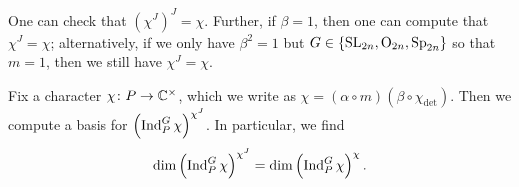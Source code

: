 \begin{remark}
    One can check that $\left(\chi^J\right)^J=\chi$. Further, if $\beta=1$, then one can compute that $\chi^J=\chi$; alternatively, if we only have $\beta^2=1$ but $G\in\{\mathrm{SL}_{2n},\mathrm{O}_{2n},\mathrm{Sp}_{2n}\}$ so that $m=1$, then we still have $\chi^J=\chi$.
	
\end{remark}
\begin{proposition} \label{prop:twisted-ind-basis}
	Fix a character $\chi\colon P\to\mathbb C^\times$, which we write as $\chi=(\alpha\circ m)(\beta\circ\chi_{\det})$. Then we compute a basis for $\left(\operatorname{Ind}_P^G\chi\right)^{\chi^J}$. %
    In particular, we find
	\[\dim\left(\operatorname{Ind}_P^G\chi\right)^{\chi^J}=\dim\left(\operatorname{Ind}_P^G\chi\right)^{\chi}.\]
\end{proposition}
